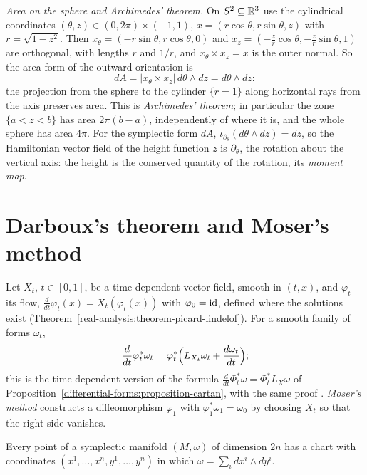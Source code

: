 \begin{example}\label{symplectic-geometry:example-archimedes}
\emph{Area on the sphere and Archimedes' theorem.} On $S^2 \subseteq \mathbb{R}^3$ use the cylindrical coordinates $(\theta, z) \in (0, 2\pi) \times (-1, 1)$, $x = (r\cos\theta, r\sin\theta, z)$ with $r = \sqrt{1 - z^2}$.
Then $x_\theta = (-r\sin\theta, r\cos\theta, 0)$ and $x_z = (-\frac zr\cos\theta, -\frac zr\sin\theta, 1)$ are orthogonal, with lengths $r$ and $1/r$, and $x_\theta \times x_z = x$ is the outer normal. So
the area form of the outward orientation is
\[
dA = |x_\theta \times x_z|\,d\theta \wedge dz = d\theta \wedge dz :
\]
the projection from the sphere to the cylinder $\{r = 1\}$ along horizontal rays from the axis preserves area. This is \emph{Archimedes' theorem}; in particular the zone $\{a < z < b\}$ has area $2\pi(b - a)$,
independently of where it is, and the whole sphere has area $4\pi$. For the symplectic form $dA$, $\iota_{\partial_\theta}(d\theta \wedge dz) = dz$, so the Hamiltonian vector field of the height function $z$
is $\partial_\theta$, the rotation about the vertical axis: the height is the conserved quantity of the rotation, its \emph{moment map}.
\end{example}

\section{Darboux's theorem and Moser's method}\label{symplectic-geometry:section-darboux}

Let $X_t$, $t \in [0, 1]$, be a time-dependent vector field, smooth in $(t, x)$, and $\varphi_t$ its flow, $\frac{d}{dt}\varphi_t(x) = X_t(\varphi_t(x))$ with $\varphi_0 = \mathrm{id}$, defined where the solutions exist
(Theorem~\ref{real-analysis:theorem-picard-lindelof}). For a smooth family of forms $\omega_t$,
\begin{equation}\label{symplectic-geometry:equation-moser}
\frac{d}{dt}\varphi_t^*\omega_t = \varphi_t^*\Bigl(L_{X_t}\omega_t + \frac{d\omega_t}{dt}\Bigr);
\end{equation}
this is the time-dependent version of the formula $\frac{d}{dt}\Phi_t^*\omega = \Phi_t^*L_X\omega$ of Proposition~\ref{differential-forms:proposition-cartan}, with the same proof \cite[Chapter 22]{lee-smooth-manifolds}.
\emph{Moser's method} constructs a diffeomorphism $\varphi_1$ with $\varphi_1^*\omega_1 = \omega_0$ by choosing $X_t$ so that the right side vanishes.

\begin{theorem}[Darboux]\label{symplectic-geometry:theorem-darboux}
Every point of a symplectic manifold $(M, \omega)$ of dimension $2n$ has a chart with coordinates $(x^1, \ldots, x^n, y^1, \ldots, y^n)$ in which $\omega = \sum_idx^i \wedge dy^i$.
\end{theorem}


